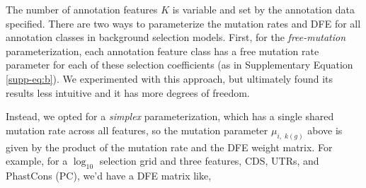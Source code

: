 \documentclass[11pt]{article}
\begin{document}
The number of annotation features $K$ is variable and set by the annotation
data specified. There are two ways to parameterize the mutation rates and DFE
for all annotation classes in background selection models. First, for the
\emph{free-mutation} parameterization, each annotation feature class has a free
mutation rate parameter for each of these selection coefficients (as in
Supplementary Equation \ref{supp-eq:b}). We experimented with this approach,
but ultimately found its results less intuitive and it has more degrees of
freedom.





Instead, we opted for a \emph{simplex} parameterization, which has a single
shared mutation rate across all features, so the mutation parameter $\mu_{i,
\;k(g)}$ above is given by the product of the mutation rate and the DFE weight
matrix. For example, for a $\log_{10}$ selection grid and three features, CDS,
UTRs, and PhastCons (PC), we'd have a DFE matrix like,
\end{document}
